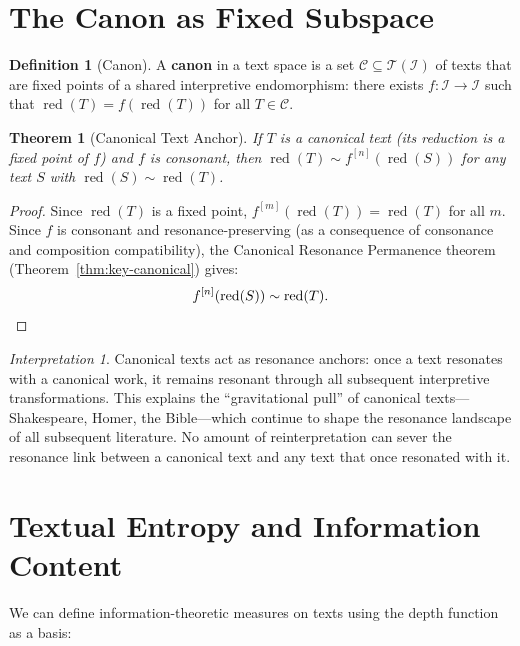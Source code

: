 \documentclass[11pt,openany]{book}
\theoremstyle{definition}
\newtheorem{definition}[axiom]{Definition}
\theoremstyle{plain}
\newtheorem{theorem}[axiom]{Theorem}
\theoremstyle{remark}
\newtheorem{interpretation}[axiom]{Interpretation}
\newcommand{\IS}{\mathcal{I}}               %
\newcommand{\res}{\sim}                      %
\begin{document}
\section{The Canon as Fixed Subspace}

\begin{definition}[Canon]
A \textbf{canon} in a text space is a set $\mathcal{C} \subseteq \mathcal{T}(\IS)$ of texts that are fixed points of a shared interpretive endomorphism: there exists $f : \IS \to \IS$ such that $\operatorname{red}(T) = f(\operatorname{red}(T))$ for all $T \in \mathcal{C}$.
\end{definition}

\begin{theorem}[Canonical Text Anchor]
\label{thm:canonical-anchor}
If $T$ is a canonical text (its reduction is a fixed point of $f$) and $f$ is consonant, then $\operatorname{red}(T) \res f^{[n]}(\operatorname{red}(S))$ for any text $S$ with $\operatorname{red}(S) \res \operatorname{red}(T)$.
\end{theorem}

\begin{proof}
Since $\operatorname{red}(T)$ is a fixed point, $f^{[m]}(\operatorname{red}(T)) = \operatorname{red}(T)$ for all $m$. Since $f$ is consonant and resonance-preserving (as a consequence of consonance and composition compatibility), the Canonical Resonance Permanence theorem (Theorem~\ref{thm:key-canonical}) gives:
\[
f^{[n]}(\operatorname{red}(S)) \res \operatorname{red}(T). \qedhere
\]
\end{proof}

\begin{interpretation}
Canonical texts act as resonance anchors: once a text resonates with a canonical work, it remains resonant through all subsequent interpretive transformations. This explains the ``gravitational pull'' of canonical texts---Shakespeare, Homer, the Bible---which continue to shape the resonance landscape of all subsequent literature. No amount of reinterpretation can sever the resonance link between a canonical text and any text that once resonated with it.
\end{interpretation}

\section{Textual Entropy and Information Content}

We can define information-theoretic measures on texts using the depth function as a basis:
\end{document}
